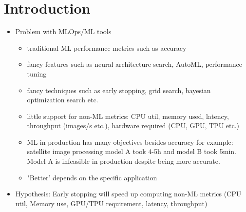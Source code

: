 \chapter{Introduction}

\begin{itemize}
    \item Problem with MLOps/ML tools
        \begin{itemize}
            \item traditional ML performance metrics such as accuracy
            \item fancy features such as neural architecture search, AutoML, performance tuning
            \item fancy techniques such as early stopping, grid search, bayesian optimization search etc.
            \item little support for non-ML metrics: CPU util, memory used, latency, throughput (images/s etc.), hardware required (CPU, GPU, TPU etc.)
            \item ML in production has many objectives besides accuracy for example: satellite image processing model A took 4-5h and model B took 5min. Model A is infeasible in production despite being more accurate.
            \item "Better' depends on the specific application
        \end{itemize}
    \item Hypothesis: Early stopping will speed up computing non-ML metrics (CPU util, Memory use, GPU/TPU requirement, latency, throughput)
\end{itemize}